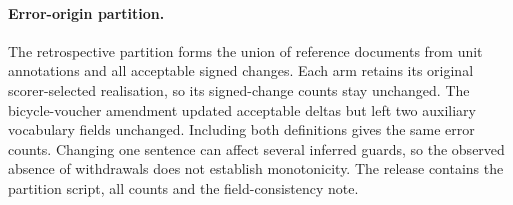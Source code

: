 \paragraph{Error-origin partition.}
The retrospective partition forms the union of reference documents from
unit annotations and all acceptable signed changes. Each arm retains its
original scorer-selected realisation, so its signed-change counts stay
unchanged. The bicycle-voucher amendment updated acceptable deltas but left
two auxiliary vocabulary fields unchanged. Including both definitions gives
the same error counts. Changing one sentence can affect several inferred
guards, so the observed absence of withdrawals does not establish
monotonicity. The release contains the partition script, all counts and
the field-consistency note.
